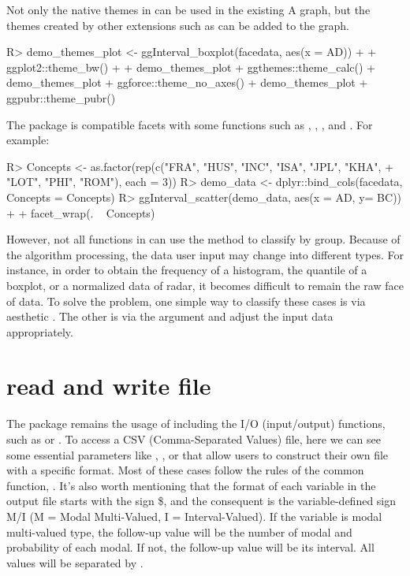 \documentclass[article]{jss}
\begin{document}
Not only the native themes in  can be used in the existing A graph, but the themes created by other  extensions such as  can be added to the graph.
\begin{CodeChunk}
\begin{CodeInput}
R> demo_themes_plot <- ggInterval_boxplot(facedata, aes(x = AD)) +
+      ggplot2::theme_bw()
+
+  demo_themes_plot + ggthemes::theme_calc()
+  demo_themes_plot + ggforce::theme_no_axes()
+  demo_themes_plot + ggpubr::theme_pubr()
\end{CodeInput}
\end{CodeChunk}

The  package is compatible  facets with some functions such as , , , and . For example:
\begin{CodeChunk}
\begin{CodeInput}
R> Concepts <- as.factor(rep(c("FRA", "HUS", "INC", "ISA", "JPL", "KHA",
+                             "LOT", "PHI", "ROM"), each = 3))
R> demo_data <- dplyr::bind_cols(facedata, Concepts = Concepts)
R> ggInterval_scatter(demo_data, aes(x = AD, y= BC)) + 
+      facet_wrap(. ~ Concepts)
\end{CodeInput}
\end{CodeChunk}

However, not all functions in  can use the method to classify by group. Because of the algorithm processing, the data user input may change into different types. For instance, in order to obtain the frequency of a histogram, the quantile of a boxplot, or a normalized data of radar, it becomes difficult to remain the raw face of data. To solve the problem, one simple way to classify these cases is via aesthetic . The other is via the  argument and adjust the input data appropriately.


\section*{read and write file}

The  package remains the usage of  including the I/O (input/output) functions, such as  or . To access a CSV (Comma-Separated Values) file, here we can see some essential parameters like , , or  that allow users to construct their own file with a specific format. Most of these cases follow the rules of the common  function, . It's also worth mentioning that the format of each variable in the output file starts with the sign \$, and the consequent is the variable-defined sign M/I (M = Modal Multi-Valued, I = Interval-Valued). If the variable is modal multi-valued type, the follow-up value will be the number of modal and probability of each modal. If not, the follow-up value will be its interval. All values will be separated by .
\end{document}
